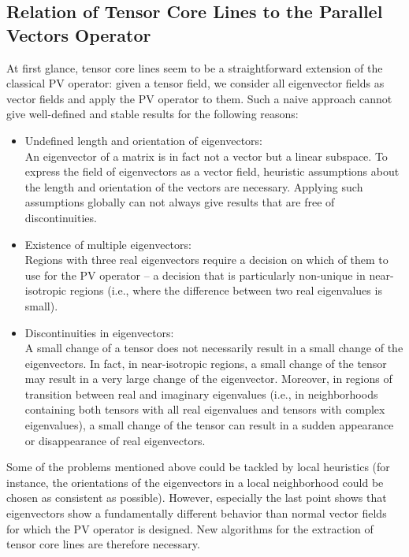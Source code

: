 \subsection*{Relation of Tensor Core Lines to the Parallel Vectors Operator}
%
At first glance, tensor core lines seem to be a straightforward extension of the
classical \ac{PV} operator:
%
given a tensor field, we consider all eigenvector fields as vector fields
and apply the \ac{PV} operator to them.
%
Such a naive approach cannot give well-defined and stable results for the
following reasons:
%
\begin{itemize}
    \item
    Undefined length and orientation of eigenvectors:\\
    An eigenvector of a matrix is in fact not a vector but a linear subspace.
    To express the field of eigenvectors as a vector field, heuristic
    assumptions about the length and orientation of the vectors are necessary.
    Applying such assumptions globally can not always give results that are
    free of discontinuities.
    \item
    Existence of multiple eigenvectors:\\
    Regions with three real eigenvectors require a decision on which of them to
    use for the \ac{PV} operator -- a decision that is particularly non-unique in
    near-isotropic regions (i.e., where the difference between two real
    eigenvalues is small).
    \item
    Discontinuities in eigenvectors:\\
    A small change of a tensor does not necessarily result in a small change of
    the eigenvectors.
    In fact, in near-isotropic regions, a small change of the tensor may result
    in a very large change of the eigenvector.
    Moreover, in regions of transition between real and imaginary eigenvalues
    (i.e., in neighborhoods containing both tensors with all real eigenvalues
    and tensors with complex eigenvalues), a small change of the tensor can
    result in a sudden appearance or disappearance of real eigenvectors.
\end{itemize}
%
Some of the problems mentioned above could be tackled by local heuristics (for
instance, the orientations of the eigenvectors in a local neighborhood could be
chosen as consistent as possible).
%
However, especially the last point shows that eigenvectors show a fundamentally
different behavior than normal vector fields for which the \ac{PV} operator is
designed.
%
New algorithms for the extraction of tensor core lines are therefore necessary.
%
